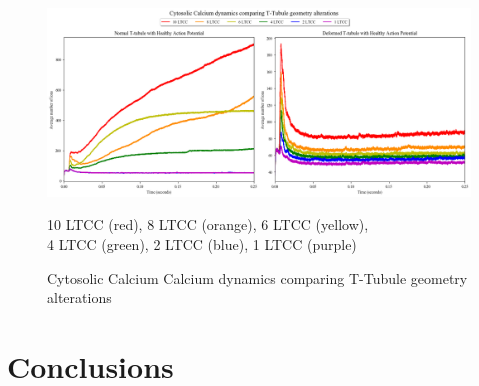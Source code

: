 \documentclass[12pt]{ucsddissertation}
\begin{document}
\setcounter{figure}{12}
\begin{figure}
\centering
	\includegraphics[scale=0.4]{cytCa_geom_Comparison.png}
		\caption{Cytosolic Calcium Calcium dynamics comparing T-Tubule geometry alterations}10 LTCC (red), 8 LTCC (orange), 6 LTCC (yellow), \\ 4 LTCC (green), 2 LTCC (blue), 1 LTCC (purple)
\label{fig:geometry comparison} 
\end{figure}

 \section{Conclusions}
\end{document}
